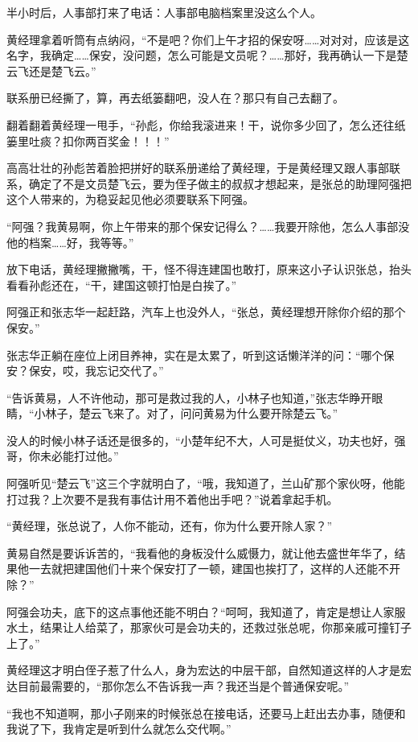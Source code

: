 半小时后，人事部打来了电话：人事部电脑档案里没这么个人。

黄经理拿着听筒有点纳闷，“不是吧？你们上午才招的保安呀……对对对，应该是这名字，我确定……保安，没问题，怎么可能是文员呢？……那好，我再确认一下是楚云飞还是楚飞云。”

联系册已经撕了，算，再去纸篓翻吧，没人在？那只有自己去翻了。

翻着翻着黄经理一甩手，“孙彪，你给我滚进来！干，说你多少回了，怎么还往纸篓里吐痰？扣你两百奖金！！！”

高高壮壮的孙彪苦着脸把拼好的联系册递给了黄经理，于是黄经理又跟人事部联系，确定了不是文员楚飞云，要为侄子做主的叔叔才想起来，是张总的助理阿强把这个人带来的，为稳妥起见他必须要联系下阿强。

“阿强？我黄易啊，你上午带来的那个保安记得么？……我要开除他，怎么人事部没他的档案……好，我等等。”

放下电话，黄经理撇撇嘴，干，怪不得连建国也敢打，原来这小子认识张总，抬头看看孙彪还在，“干，建国这顿打怕是白挨了。”

阿强正和张志华一起赶路，汽车上也没外人，“张总，黄经理想开除你介绍的那个保安。”

张志华正躺在座位上闭目养神，实在是太累了，听到这话懒洋洋的问：“哪个保安？保安，哎，我忘记交代了。”

“告诉黄易，人不许他动，那可是救过我的人，小林子也知道，”张志华睁开眼睛，“小林子，楚云飞来了。对了，问问黄易为什么要开除楚云飞。”

没人的时候小林子话还是很多的，“小楚年纪不大，人可是挺仗义，功夫也好，强哥，你未必能打过他。”

阿强听见“楚云飞”这三个字就明白了，“哦，我知道了，兰山矿那个家伙呀，他能打过我？上次要不是我有事估计用不着他出手吧？”说着拿起手机。

“黄经理，张总说了，人你不能动，还有，你为什么要开除人家？”

黄易自然是要诉诉苦的，“我看他的身板没什么威慑力，就让他去盛世年华了，结果他一去就把建国他们十来个保安打了一顿，建国也挨打了，这样的人还能不开除？”

阿强会功夫，底下的这点事他还能不明白？“呵呵，我知道了，肯定是想让人家服水土，结果让人给菜了，那家伙可是会功夫的，还救过张总呢，你那亲戚可撞钉子上了。”

黄经理这才明白侄子惹了什么人，身为宏达的中层干部，自然知道这样的人才是宏达目前最需要的，“那你怎么不告诉我一声？我还当是个普通保安呢。”

“我也不知道啊，那小子刚来的时候张总在接电话，还要马上赶出去办事，随便和我说了下，我肯定是听到什么就怎么交代啊。”

